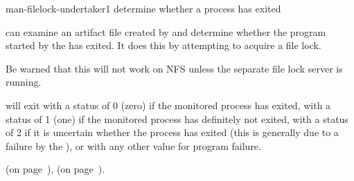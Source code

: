 \begin{ManPage}{}{man-filelock-undertaker}{1}
{determine whether a process has exited}


\Synopsis {}


\Description
{} can examine an artifact file created by
 and determine whether the program started by
the  has exited.  It does this by attempting to acquire
a file lock.

Be warned that this will not work on NFS unless the separate
file lock server is running.

\begin{Options}
\end{Options}

\ExitStatus 
{} will exit with a status of 0 (zero) if the
monitored process has exited, with a status of 1 (one) if the
monitored process has definitely not exited, with a status of 2 if it
is uncertain whether the process has exited (this is generally due to
a failure by the ), or with any other value
for program failure.

\SeeAlso
{} (on page~\pageref{man-uniq-pid-undertaker}),
 (on page~\pageref{man-filelock-midwife}).

\end{ManPage}

